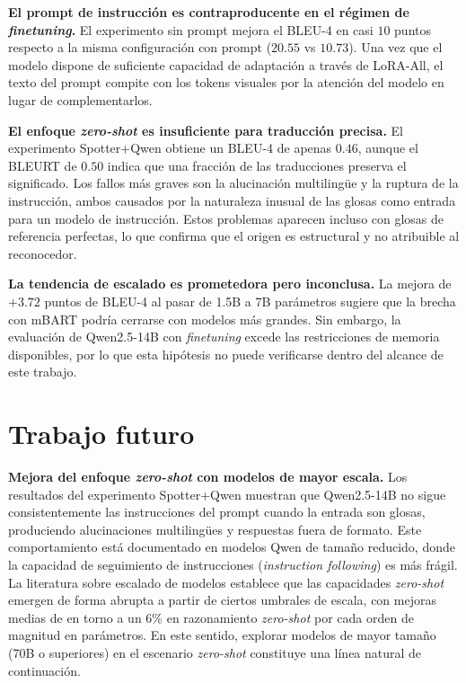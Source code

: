 \textbf{El prompt de instrucción es contraproducente en el régimen de \textit{finetuning}.}
El experimento sin prompt mejora el BLEU-4 en casi $10$ puntos respecto a la misma configuración con prompt ($20.55$ vs $10.73$).
Una vez que el modelo dispone de suficiente capacidad de adaptación a través de LoRA-All, el texto del prompt compite con los tokens visuales por la atención del modelo en lugar de complementarlos.

\textbf{El enfoque \textit{zero-shot} es insuficiente para traducción precisa.}
El experimento Spotter+Qwen obtiene un BLEU-4 de apenas $0.46$, aunque el BLEURT de $0.50$ indica que una fracción de las traducciones preserva el significado.
Los fallos más graves son la alucinación multilingüe y la ruptura de la instrucción, ambos causados por la naturaleza inusual de las glosas como entrada para un modelo de
instrucción.
Estos problemas aparecen incluso con glosas de referencia perfectas, lo que confirma que el origen es estructural y no atribuible al reconocedor.

\textbf{La tendencia de escalado es prometedora pero inconclusa.}
La mejora de $+3.72$ puntos de BLEU-4 al pasar de 1.5B a 7B parámetros sugiere que la brecha con mBART podría cerrarse con modelos más grandes.
Sin embargo, la evaluación de Qwen2.5-14B con \textit{finetuning} excede las restricciones de memoria disponibles, por lo que esta hipótesis no puede verificarse
dentro del alcance de este trabajo.

\section{Trabajo futuro}

\textbf{Mejora del enfoque \textit{zero-shot} con modelos de mayor escala.}
Los resultados del experimento Spotter+Qwen muestran que Qwen2.5-14B no sigue consistentemente las instrucciones del prompt cuando la entrada son glosas, produciendo
alucinaciones multilingües y respuestas fuera de formato.
Este comportamiento está documentado en modelos Qwen de tamaño reducido, donde la capacidad de seguimiento de instrucciones (\textit{instruction following}) es más frágil.
La literatura sobre escalado de modelos establece que las capacidades \textit{zero-shot} emergen de forma abrupta a partir de ciertos umbrales de escala, con mejoras medias
de en torno a un $6\%$ en razonamiento \textit{zero-shot} por cada orden de magnitud
en parámetros.
En este sentido, explorar modelos de mayor tamaño (70B o superiores) en el escenario \textit{zero-shot} constituye una línea natural de continuación.

